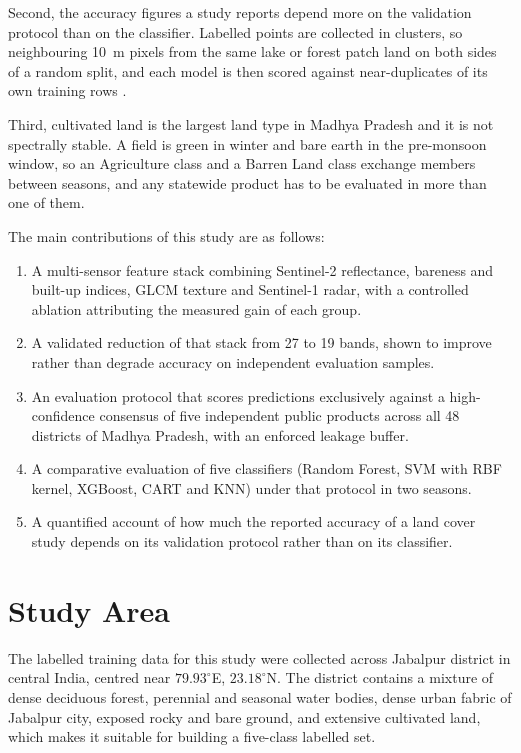 \documentclass[conference]{IEEEtran}
\begin{document}
Second, the accuracy figures a study reports depend more on the
validation protocol than on the classifier. Labelled points are
collected in clusters, so neighbouring 10~m pixels from the same lake or
forest patch land on both sides of a random split, and each model is
then scored against near-duplicates of its own training rows
\cite{ref21,ref22}.

Third, cultivated land is the largest land type in Madhya Pradesh and it
is not spectrally stable. A field is green in winter and bare earth in
the pre-monsoon window, so an Agriculture class and a Barren Land class
exchange members between seasons, and any statewide product has to be
evaluated in more than one of them.

The main contributions of this study are as follows:

\begin{enumerate}
\item A multi-sensor feature stack combining Sentinel-2 reflectance,
bareness and built-up indices, GLCM texture and Sentinel-1 radar, with a
controlled ablation attributing the measured gain of each group.
\item A validated reduction of that stack from 27 to 19 bands, shown to
improve rather than degrade accuracy on independent evaluation samples.
\item An evaluation protocol that scores predictions exclusively against
a high-confidence consensus of five independent public products across
all 48 districts of Madhya Pradesh, with an enforced leakage buffer.
\item A comparative evaluation of five classifiers (Random Forest, SVM
with RBF kernel, XGBoost, CART and KNN) under that protocol in two
seasons.
\item A quantified account of how much the reported accuracy of a land
cover study depends on its validation protocol rather than on its
classifier.
\end{enumerate}

\section{Study Area}

The labelled training data for this study were collected across Jabalpur
district in central India, centred near $79.93^\circ$E,
$23.18^\circ$N. The district contains a mixture of dense deciduous
forest, perennial and seasonal water bodies, dense urban fabric of
Jabalpur city, exposed rocky and bare ground, and extensive cultivated
land, which makes it suitable for building a five-class labelled set.
\end{document}
